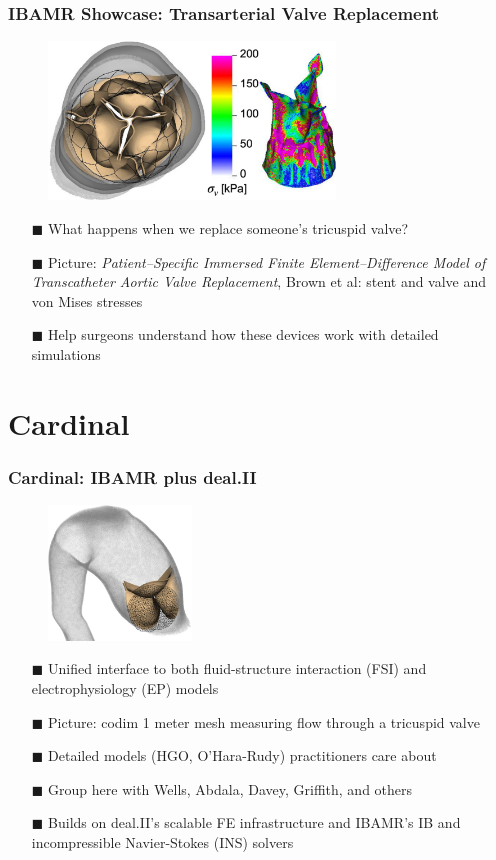 \documentclass[8pt]{beamer}
\begin{document}
\begin{frame}
    \frametitle{IBAMR Showcase: Transarterial Valve Replacement}
    \begin{figure}
        \centering
        \includegraphics[width=3in]{tavr.png}
    \end{figure}
    \begin{itemize}
        \item[$\blacksquare$] What happens when we replace someone's tricuspid valve?
        \item[$\blacksquare$] Picture: \emph{Patient–Speciﬁc Immersed Finite Element–Difference Model
of Transcatheter Aortic Valve Replacement}, Brown et al: stent and valve and von Mises stresses
        \item[$\blacksquare$] Help surgeons understand how these devices work with detailed simulations
    \end{itemize}
\end{frame}

\section{Cardinal}
\begin{frame}
    \frametitle{Cardinal: IBAMR plus deal.II}
    \begin{figure}
        \centering
        \includegraphics[width=1.5in]{metermesh.png}
    \end{figure}
    \begin{itemize}
        \item[$\blacksquare$] Unified interface to both fluid-structure
            interaction (FSI) and electrophysiology (EP) models
        \item[$\blacksquare$] Picture: codim 1 meter mesh measuring flow through
            a tricuspid valve
        \item[$\blacksquare$] Detailed models (HGO, O'Hara-Rudy) practitioners care about
        \item[$\blacksquare$] Group here with Wells, Abdala, Davey, Griffith, and others
        \item[$\blacksquare$] Builds on deal.II's scalable FE infrastructure and 
            IBAMR's IB and incompressible Navier-Stokes (INS) solvers
    \end{itemize}
\end{frame}
\end{document}
